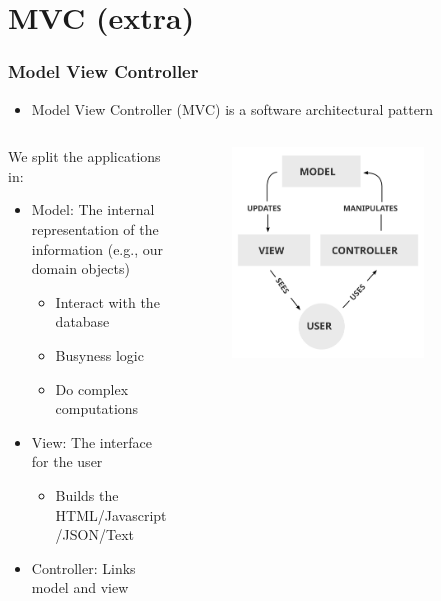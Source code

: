 \documentclass[fleqn,aspectratio=169,10pt]{beamer}
\begin{document}
\section{MVC (extra)}

\begin{frame}[fragile]
  \frametitle{Model View Controller}
  \pause
  \begin{itemize}
    \item Model View Controller (MVC) is a software architectural pattern
  \end{itemize}
  \pause

  \begin{columns}
    \begin{column}{.6\linewidth}
      \begin{block}{We split the applications in:}
        \begin{itemize}
          \item Model: The internal representation of the information (e.g., our domain objects)
                \begin{itemize}
                  \item Interact with the database
                  \item Busyness logic
                  \item Do complex computations
                \end{itemize}
          \item View: The interface for the user
                \begin{itemize}
                  \item Builds the HTML/Javascript/JSON/Text
                \end{itemize}
          \item Controller: Links model and view
        \end{itemize}
      \end{block}
    \end{column}
    \begin{column}{.4\linewidth}
      \begin{figure}[]
        \centering
        \includegraphics[width=0.8\textwidth]{mvc}

\end{figure}
\end{column}
\end{columns}
\end{frame}
\end{document}
